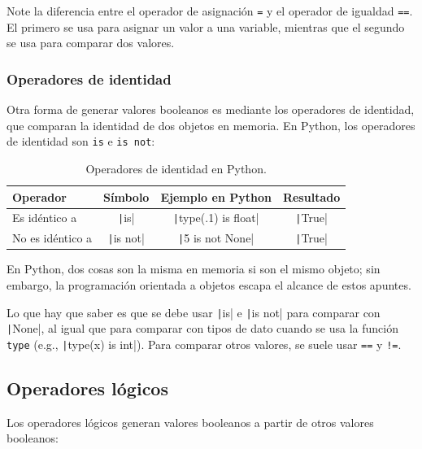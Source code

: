 \begin{tip}
    Note la diferencia entre el operador de asignación \texttt{=} y el operador de igualdad \texttt{==}. El primero se usa para asignar un valor a una variable, mientras que el segundo se usa para comparar dos valores.
\end{tip}

\subsubsection{Operadores de identidad}

Otra forma de generar valores booleanos es mediante los operadores de identidad, que comparan la identidad de dos objetos en memoria. En Python, los operadores de identidad son \texttt{is} e \texttt{is not}:

\begin{table}[h]
\centering
\begin{tabular}{|l|c|c|c|}
\hline
\textbf{Operador} & \textbf{Símbolo} & \textbf{Ejemplo en Python} & \textbf{Resultado} \\
\hline
Es idéntico a & \texttt|is| & \texttt|type(.1) is float| & \texttt|True| \\
\hline
No es idéntico a & \texttt|is not| & \texttt|5 is not None| & \texttt|True| \\
\hline
\end{tabular}
\caption{Operadores de identidad en Python.}
\label{tab:operadores-identidad}
\end{table}

En Python, dos cosas son la misma en memoria si son el mismo objeto; sin embargo, la programación orientada a objetos escapa el alcance de estos apuntes.

Lo que hay que saber es que se debe usar \texttt|is| e \texttt|is not| para comparar con \texttt|None|, al igual que para comparar con tipos de dato cuando se usa la función \texttt{type} (e.g., \texttt|type(x) is int|). Para comparar otros valores, se suele usar \texttt{==} y \texttt{!=}.

\subsection{Operadores lógicos}

Los operadores lógicos generan valores booleanos a partir de otros valores booleanos:

